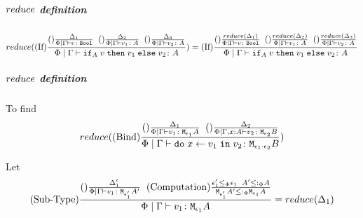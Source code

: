 {            \subparagraph{$reduce$ definition}
                \begin{equation}
                    reduce((\text{If}) \frac{
                        (\text{}) \frac{\Delta_1}{\Phi\mid\Gamma \vdash v \colon \texttt{Bool}}
                        \;\;
                        (\text{}) \frac{\Delta_2}{\Phi\mid\Gamma \vdash v_1 \colon A}
                        \;\;
                        (\text{}) \frac{\Delta_3}{\Phi\mid\Gamma \vdash v_2 \colon A}
                    }{
                        \Phi\mid\Gamma \vdash \texttt{if}_{A}\; v\; \texttt{then}\; v_1 \;\texttt{else} \; v_2 \colon A
                    }) = (\text{If}) \frac{
                        (\text{}) \frac{reduce(\Delta_1)}{\Phi\mid\Gamma \vdash v \colon \texttt{Bool}}
                        \;\;
                        (\text{}) \frac{reduce(\Delta_2)}{\Phi\mid\Gamma \vdash v_1 \colon A}
                        \;\;
                        (\text{}) \frac{reduce(\Delta_3)}{\Phi\mid\Gamma \vdash v_2 \colon A}
                    }{
                        \Phi\mid\Gamma \vdash \texttt{if}_{A}\; v\; \texttt{then}\; v_1 \;\texttt{else} \; v_2 \colon A
                    }
                \end{equation}

            
        
                \subparagraph{$reduce$ definition}

                To find
                \begin{equation}
                    reduce(
                        (\text{Bind}) \frac{
                            (\text{}) \frac{
                                \Delta_1
                            }{
                                \Phi\mid\Gamma \vdash v_1 \colon \texttt{M}_{\epsilon_1}{A}
                            }
                            \;\;
                            (\text{}) \frac{
                                \Delta_2
                            }{
                                \Phi\mid\Gamma, x: A \vdash v_2 \colon \texttt{M}_{\epsilon_2}{B}
                            }
                        }{
                            \Phi\mid\Gamma \vdash \texttt{do}\; x \leftarrow v_1 \;\texttt{in}\; v_2 \colon \texttt{M}_{\epsilon_1\cdot\epsilon_2}{B}
                        }
                    )
                \end{equation}


                Let \begin{equation}
                    (\text{Sub-Type}) \frac{
                        (\text{}) \frac{\Delta'_1}{\Phi\mid\Gamma \vdash v_1 \colon \texttt{M}_{\epsilon'_1}{A'}}
                    \;\;
                    (\text{Computation}) \frac{ \epsilon_1'\leq_{\Phi} \epsilon_1\;\; A' \leq:_\Phi A }{\texttt{M}_{\epsilon_1'}{ A' }\leq:_\Phi\texttt{M}_{\epsilon_1}{A}}
                    }{
                        \Phi\mid\Gamma \vdash v_1 \colon \texttt{M}_{\epsilon_1}{A}
                    } = reduce(\Delta_1)
                \end{equation}

}
